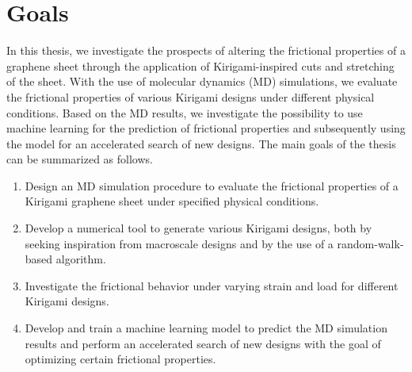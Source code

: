 \section{Goals}\label{sec:goals} In this thesis, we investigate the prospects of
altering the frictional properties of a graphene sheet through the application
of Kirigami-inspired cuts and stretching of the sheet. With the use of molecular
dynamics (\acrshort{MD}) simulations, we evaluate the frictional properties of
various Kirigami designs under different physical conditions. Based on the
\acrshort{MD} results, we investigate the possibility to use machine learning
for the prediction of frictional properties and subsequently using the model for
an accelerated search of new designs. The main goals of the thesis can be
summarized as follows.
\begin{enumerate} 
    \item Design an \acrshort{MD} simulation procedure to evaluate the
    frictional properties of a Kirigami graphene sheet under specified physical
    conditions.
    \item Develop a numerical tool to generate various Kirigami designs,
    both by seeking inspiration from macroscale designs and by the use of a
    random-walk-based algorithm.
    \item Investigate the frictional behavior under varying strain and load for
    different Kirigami designs.
    \item Develop and train a machine learning model to predict the
    \acrshort{MD} simulation results and perform an accelerated search of new
    designs with the goal of optimizing certain frictional properties.
\end{enumerate}





